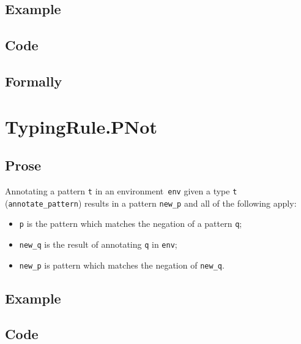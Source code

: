\documentclass{book}
\begin{document}
  \subsection{Example}

  \subsection{Code}

\begin{emptyformal}
    \subsection{Formally}
\end{emptyformal}


\section{TypingRule.PNot \label{sec:TypingRule.PNot}}

  \subsection{Prose}
   Annotating a pattern \texttt{t} in an environment~\texttt{env} given a type \texttt{t} (\texttt{annotate\_pattern}) results in a pattern \texttt{new\_p} and all of the following apply:
   \begin{itemize}
   \item \texttt{p} is the pattern which matches the negation of a pattern \texttt{q};
   \item \texttt{new\_q} is the result of annotating \texttt{q} in \texttt{env};
   \item \texttt{new\_p} is pattern which matches the negation of \texttt{new\_q}.
   \end{itemize}

  \subsection{Example}

  \subsection{Code}
\end{document}
